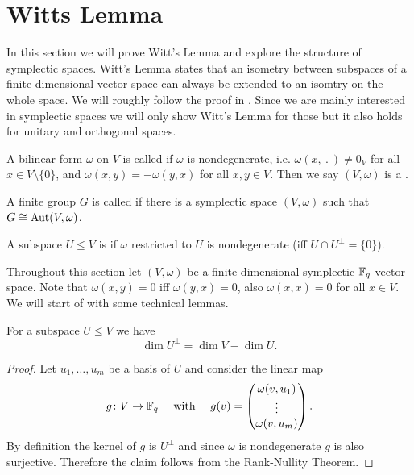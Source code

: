 \section{Witts Lemma}
In this section we will prove Witt's Lemma and explore the structure of symplectic spaces. Witt's Lemma states that an isometry between subspaces of a finite dimensional vector space can always be extended to an isomtry on the whole space.  We will roughly follow the proof in \cite{Witt}. Since we are mainly interested in symplectic spaces we will only show Witt's Lemma for those but it also holds for unitary and orthogonal spaces.

\begin{definition}
A bilinear form $\omega$ on $V$ is called  if $\omega$ is nondegenerate, i.e. $\omega(x,\ .\ )\not=0_V$ for all $x\in V\setminus\{0\}$, and $\omega(x,y)=-\omega(y,x)$ for all $x,y\in V$. Then we say $(V,\omega)$ is a .

A finite group $G$ is called  if there is a symplectic space $(V,\omega)$ such that $G\cong\operatorname{Aut}(V,\omega)$. 

A subspace $U\leq V$ is  if $\omega$ restricted to $U$ is nondegenerate (iff $U\cap U^\bot=\{0\}$). 

\end{definition}
Throughout this section let $(V,\omega)$ be a finite dimensional symplectic $\mathbb{F}_q$ vector space.
Note that $\omega(x,y)=0$ iff $\omega(y,x)=0$, also $\omega(x,x)=0$ for all $x\in V$.
We will start of with some technical lemmas.



\begin{lemma}\label{lem:dimUBot}
For a subspace $U\leq V$ we have 
\[\dim U^\bot= \dim V -\dim U.\]
\end{lemma}
\begin{proof}
Let $u_1,\dots,u_m$ be a basis of $U$ and consider the linear map
\begin{align*}g\colon V\to \mathbb{F}_q&&\text{ with }&&g(v)=
\begin{pmatrix}
\omega(v,u_1)\\
\vdots\\
\omega(v,u_m)
\end{pmatrix}.
\end{align*}
By definition the kernel of $g$ is $U^\bot$ and since $\omega$ is nondegenerate $g$ is also surjective. Therefore the claim follows from the Rank-Nullity Theorem.
\end{proof}


